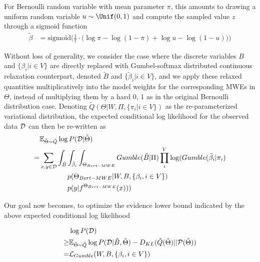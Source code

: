 For Bernoulli random variable with mean parameter $\pi$, this amounts to drawing a uniform random variable  $u \sim \Unif (0, 1)$ and compute the sampled value $z$
 through a sigmoid function \cite{gal2017concrete}
\begin{align}
\tilde{\beta} &= \text{sigmoid} \bigg(
\frac{1}{t} \cdot \big(
\log \pi
- \log (1 - \pi)
+ \log u
- \log (1 - u)
\big)
\bigg) \label{eq:gumbel-sample}
\end{align}


Without loss of generality, we consider the case where the discrete variables $B$ and $\{
\beta_i | i \in V\}$ are directly replaced with Gumbel-softmax distributed continuous relaxation counterpart, denoted $\tilde{B}$ and $ \{ \tilde{\beta}_i  | i \in V\}$, and 
we apply these relaxed quantities multiplicatively into the model weights for the corresponding MWEs in $\Theta$, 
instead of multiplying them by a hard 0, 1 as in the original Bernoulli distribution case.
Denoting $ \tilde{Q} (\Theta | W, \Pi, \{\pi_i | i \in V\})$ as the re-parameterized variational distribution, 
the expected conditional log likelihood for the observed data $\mathcal{D}$ can then be re-written as
\begin{align}
& \mathbb{E}_{\tilde{\Theta} \sim \tilde{Q}} \log P (\mathcalD | \tilde{\Theta}) \nonumber\\ 
= & \sum_{x, y \in \mathcalD} \int_{\tilde{B}} \int_{\tilde{\beta}_i}\int_{\Theta_{Bert-MWE}} Gumble(\tilde{B} | \Pi) \prod_i^{V} \log ( Gumble(\tilde{\beta}_i | \pi_i) \nonumber\\ 
& \quad \quad \quad \quad p(\Theta_{Bert-MWE} \vert W, B, \{\beta_i, i \in V\}) \nonumber\\ 
& \quad \quad \quad \quad p(y \vert f^{\Theta_{Bert-MWE}}(x)) )
\label{eq:exp-gumble}
\end{align}

Our goal now becomes, to optimize the evidence lower bound indicated by the above expected conditional log likelihood 

\begin{align}
    &\log P( \mathcalD ) \nonumber\\
    \geq& \mathbb{E}_{\tilde{\Theta} \sim \tilde{Q} } \log P (\mathcalD | \tilde{B}, \tilde{\Theta})  - D_{KL} ( \tilde{Q} ( \tilde{\Theta}) ||\mathcal{P}( \tilde{\Theta} )) \nonumber\\
    = & \mathcal{L}_{Gumble} (W, B, \{\beta_i, i \in V\}) \label{eq:elbo0}
\end{align}

